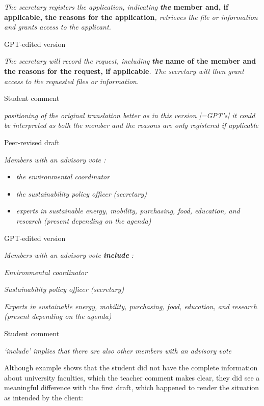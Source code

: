 \documentclass[output=paper]{langscibook}
\begin{document}
    \textit{The secretary registers the application, indicating} \textbf{\textit{the} \textbf{member} \textbf{and,} \textbf{if} \textbf{applicable,} \textbf{the} \textbf{reasons} \textbf{for} \textbf{the} \textbf{application}}\textit{, retrieves the file or information and grants access to the applicant.~}

    \ex  GPT-edited version

    \textit{The secretary will record the request, including} \textbf{\textit{the} \textbf{name} \textbf{of} \textbf{the} \textbf{member} \textbf{and} \textbf{the} \textbf{reasons} \textbf{for} \textbf{the} \textbf{request,} \textbf{if} \textbf{applicable}}\textit{. The secretary will then grant access to the requested files or information.}

    \ex   Student comment

    \textit{positioning of the original translation better as in this version [=GPT’s] it could be interpreted as both the member and the reasons are only registered if applicable}
    \z
\z

\ea%
    \label{ex:10:8}
    \ea  Peer-revised draft

    \textit{Members with an advisory vote :}

    \begin{itemize}
    \item \textit{the environmental coordinator}
    \item \textit{the sustainability policy officer (secretary)}
    \item \textit{experts in sustainable energy, mobility, purchasing, food, education, and research (present depending on the agenda)}
    \end{itemize}

    \ex  GPT-edited version

    \textit{Members with an advisory vote} \textbf{\textit{include}} \textit{:}

    \textit{Environmental coordinator}

    \textit{Sustainability policy officer (secretary)}

    \textit{Experts in sustainable energy, mobility, purchasing, food, education, and research (present depending on the agenda)}

    \ex   Student comment

    \textit{‘include’ implies that there are also other members with an advisory vote~}
    \z
\z

Although example  shows that the student did not have the complete information about university faculties, which the teacher comment makes clear, they did see a meaningful difference with the first draft, which happened to render the situation as intended by the client:
\end{document}
